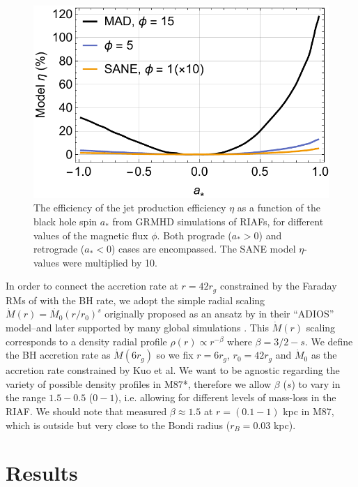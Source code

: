 \documentclass[twocolumn]{aastex62} %
\begin{document}
\begin{figure}[h]
\centering
\includegraphics[width=\linewidth]{figures/model-eta.pdf}
\caption{The efficiency of the jet production efficiency $\eta$ as a function of the black hole spin $a_*$ from GRMHD simulations of RIAFs, for different values of the magnetic flux $\phi$. Both prograde ($a_*>0$) and retrograde ($a_*<0$) cases are encompassed. The SANE model $\eta$-values were multiplied by 10. }
\label{spin-model}
\end{figure}

In order to connect the accretion rate at $r=42 r_g$ constrained by the Faraday RMs of \cite{Kuo2014} with the BH rate, we adopt the simple radial scaling $\dot{M}(r) = \dot{M_0} (r/r_0)^s$ originally proposed as an ansatz by \cite{Blandford1999} in their ``ADIOS'' model--and later supported by many global simulations . This $\dot{M}(r)$ scaling corresponds to a density radial profile $\rho(r) \propto r^{-\beta}$ where $\beta = 3/2-s$. We define the BH accretion rate as $\dot{M}(6 r_g)$ so we fix $r=6r_g$, $r_0=42 r_g$ and $\dot{M}_0$ as the accretion rate constrained by Kuo et al. We want to be agnostic regarding the variety of possible density profiles in M87*, therefore we allow $\beta$ ($s$) to vary in the range $1.5-0.5$ ($0-1$), i.e. allowing for different levels of mass-loss in the RIAF. We should note that \cite{Russell2018}  measured $\beta \approx 1.5$ at $r=(0.1-1)$ kpc in M87, which is outside but very close to the Bondi radius ($r_B = 0.03$ kpc). 






\section{Results} 
\end{document}

